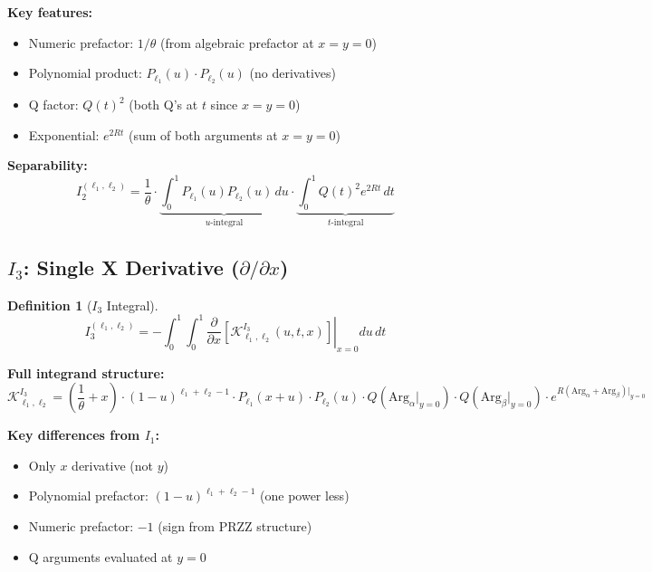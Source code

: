 \documentclass[11pt]{article}
\newtheorem{definition}{Definition}
\begin{document}
\textbf{Key features:}
\begin{itemize}
\item Numeric prefactor: $1/\theta$ (from algebraic prefactor at $x=y=0$)
\item Polynomial product: $P_{\ell_1}(u) \cdot P_{\ell_2}(u)$ (no derivatives)
\item Q factor: $Q(t)^2$ (both Q's at $t$ since $x=y=0$)
\item Exponential: $e^{2Rt}$ (sum of both arguments at $x=y=0$)
\end{itemize}

\textbf{Separability:}
\begin{equation}
I_2^{(\ell_1,\ell_2)} = \frac{1}{\theta} \cdot \underbrace{\int_0^1 P_{\ell_1}(u) P_{\ell_2}(u) \, du}_{\text{$u$-integral}} \cdot \underbrace{\int_0^1 Q(t)^2 e^{2Rt} \, dt}_{\text{$t$-integral}}
\end{equation}

\subsection{$I_3$: Single X Derivative ($\partial/\partial x$)}

\begin{definition}[$I_3$ Integral]
\begin{equation}
\boxed{
I_3^{(\ell_1,\ell_2)} = -\int_0^1 \int_0^1 \left.\frac{\partial}{\partial x}\left[\mathcal{K}^{I_3}_{\ell_1,\ell_2}(u,t,x)\right]\right|_{x=0} du\, dt
}
\end{equation}
\end{definition}

\textbf{Full integrand structure:}
\begin{equation}
\mathcal{K}^{I_3}_{\ell_1,\ell_2} = \left(\frac{1}{\theta} + x\right) \cdot (1-u)^{\ell_1+\ell_2-1} \cdot P_{\ell_1}(x+u) \cdot P_{\ell_2}(u) \cdot Q(\text{Arg}_\alpha|_{y=0}) \cdot Q(\text{Arg}_\beta|_{y=0}) \cdot e^{R(\text{Arg}_\alpha+\text{Arg}_\beta)|_{y=0}}
\end{equation}

\textbf{Key differences from $I_1$:}
\begin{itemize}
\item Only $x$ derivative (not $y$)
\item Polynomial prefactor: $(1-u)^{\ell_1+\ell_2-1}$ (one power less)
\item Numeric prefactor: $-1$ (sign from PRZZ structure)
\item Q arguments evaluated at $y=0$
\end{itemize}
\end{document}
